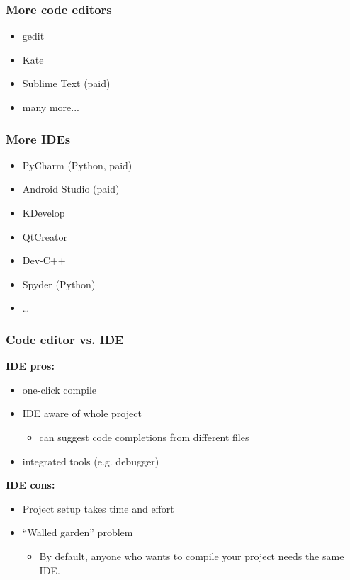 \documentclass[12pt]{article}
\begin{document}
\subsubsection{More code editors}

\begin{itemize}
    \item gedit
    \item Kate
    \item Sublime Text (paid)
    \item many more...
\end{itemize}

\subsubsection{More IDEs}
\begin{itemize}
    \item PyCharm (Python, paid)
    \item Android Studio (paid)
    \item KDevelop
    \item QtCreator
    \item Dev-C++
    \item Spyder (Python)
    \item \ldots
\end{itemize}

\subsubsection{Code editor vs. IDE}
\textbf{IDE pros:}
\begin{itemize}
    \item one-click compile
    \item IDE aware of whole project
    \begin{itemize}
        \item can suggest code completions from different files
    \end{itemize}
    \item integrated tools (e.g. debugger)
\end{itemize}

\textbf{IDE cons:}
\begin{itemize}
    \item Project setup takes time and effort
    \item ``Walled garden'' problem
    \begin{itemize}
        \item By default, anyone who wants to compile your project needs the same IDE.
    \end{itemize}
\end{itemize}
\end{document}
